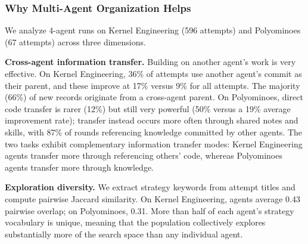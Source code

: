 

\subsubsection{Why Multi-Agent Organization Helps}
\label{sec:exp_analysis_multi}
We analyze 4-agent runs on Kernel Engineering (596 attempts) and Polyominoes (67 attempts) across three dimensions.

\textbf{Cross-agent information transfer.}
Building on another agent's work is very effective. On Kernel Engineering, 36\% of attempts use another agent's commit as their parent, and these improve at 17\% versus 9\% for all attempts. The majority (66\%) of new records originate from a cross-agent parent. On Polyominoes, direct code transfer is rarer (12\%) but still very powerful (50\% versus a 19\% average improvement rate); transfer instead occurs more often through shared notes and skills, with 87\% of rounds referencing knowledge committed by other agents. The two tasks exhibit complementary information transfer modes: Kernel Engineering agents transfer more through referencing others' code, whereas Polyominoes agents transfer more through knowledge.

\textbf{Exploration diversity.}
We extract strategy keywords from attempt titles and compute pairwise Jaccard similarity. On Kernel Engineering, agents average 0.43 pairwise overlap; on Polyominoes, 0.31. More than half of each agent's strategy vocabulary is unique, meaning that the population collectively explores substantially more of the search space than any individual agent.

